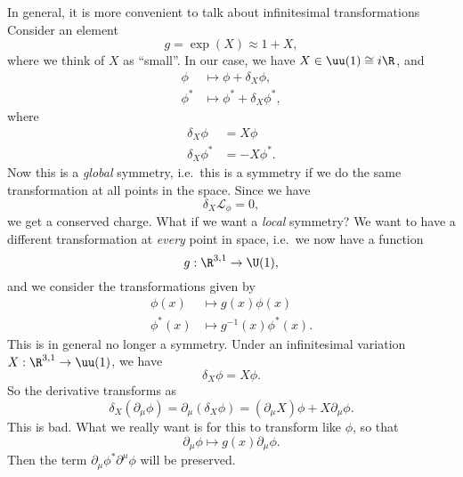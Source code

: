 \documentclass[a4paper]{article}
\begin{document}
In general, it is more convenient to talk about infinitesimal transformations Consider an element
\[
  g = \exp(X) \approx 1 + X,
\]
where we think of $X$ as ``small''. In our case, we have $X \in \uu(1) \cong i\R$, and
\begin{align*}
  \phi &\mapsto \phi + \delta_X \phi,\\
  \phi^* &\mapsto \phi ^*+ \delta_X \phi^*,
\end{align*}
where
\begin{align*}
  \delta_X \phi &= X \phi\\
  \delta_X \phi^* &= -X \phi^*.
\end{align*}
Now this is a \emph{global} symmetry, i.e.\ this is a symmetry if we do the same transformation at all points in the space. Since we have
\[
  \delta_X \mathcal{L}_\phi = 0,
\]
we get a conserved charge. What if we want a \emph{local} symmetry? We want to have a different transformation at \emph{every} point in space, i.e.\ we now have a function
\[
  g: \R^{3, 1} \to \U(1),
\]
and we consider the transformations given by
\begin{align*}
  \phi(x) &\mapsto g(x) \phi(x)\\
  \phi^*(x) &\mapsto g^{-1}(x) \phi^*(x).
\end{align*}
This is in general no longer a symmetry. Under an infinitesimal variation $X: \R^{3, 1} \to \uu(1)$, we have
\[
  \delta_X \phi = X \phi.
\]
So the derivative transforms as
\[
  \delta_X (\partial_\mu \phi) = \partial_\mu (\delta_X \phi) = (\partial_\mu X) \phi + X \partial_\mu \phi.
\]
This is bad. What we really want is for this to transform like $\phi$, so that
\[
  \partial_\mu \phi \mapsto g(x) \partial_\mu \phi.
\]
Then the term $\partial_\mu \phi^* \partial^\mu \phi$ will be preserved.
\end{document}
